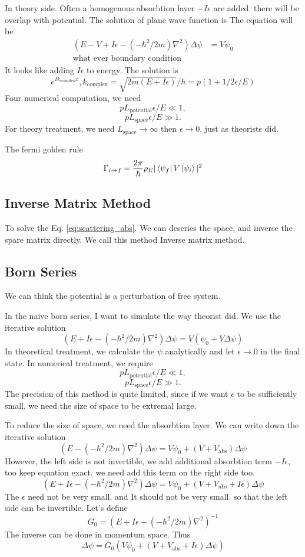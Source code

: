 \documentclass[12pt,twoside]{article}
\begin{document}
In theory side. Often a homogenous absorbtion layer $-I\epsilon$ are added. there will be overlap with potential. The solution of plane wave function is
The equation will be
\begin{align}
(E - V + I\epsilon -(-\hbar^2/2m)\nabla^2)\Delta\psi &= V\psi_0\\
\text{what ever boundary condition}
\end{align}
It looks like adding $I\epsilon$ to energy. The solution is
$$
e^{I k_\text{complex} x}, k_\text{complex} = \sqrt{2m(E+I\epsilon)}/\hbar =  p(1+1/2\epsilon/E)
$$
Four numerical computation, we need $$pL_\text{potential} \epsilon/E \ll 1,$$ $$ p L_\text{space}\epsilon/E \gg 1.$$
For theory treatment, we need $L_\text{space}\rightarrow \infty$ then $\epsilon \rightarrow 0$. just as theorists did.

The fermi golden rule
$$
\Gamma_{i\rightarrow f} = \frac{2\pi}{\hbar} \rho_E |\bra{\psi_f}V\ket{\psi_i}|^2
$$
\subsection{Inverse Matrix Method}
To solve the Eq. \ref{eq:scattering_abs}. We can descries the space, and inverse the spare matrix directly. We call this method Inverse matrix method.





\subsection{Born Series}
We can think the potential is a perturbation of free system.

In the naive born series, I want to simulate the way theorist did. We use the iterative solution
$$
(E + I\epsilon-(-\hbar^2/2m)\nabla^2)\Delta\psi = V(\psi_0 + V\Delta \psi)
$$
In theoretical treatment, we calculate the $\psi$ analytically and let $\epsilon \rightarrow 0$ in the final state.
In numerical treatment, we require
$$pL_\text{potential} \epsilon/E \ll 1,$$ $$ p L_\text{space}\epsilon/E \gg 1.$$
The precision of this method is quite limited, since if we want $\epsilon$ to be sufficiently small, we need the size of space to be extremal large.


To reduce the size of space, we need the absorbtion layer. We can write down the iterative solution
$$
(E -(-\hbar^2/2m)\nabla^2)\Delta\psi = V\psi_0 + (V+V_\text{abs})\Delta \psi
$$
However, the left side is not invertible, we add additional absorbtion term $-I\epsilon$, too keep equation exact. we need add this term on the right side too.
$$
(E + I\epsilon-(-\hbar^2/2m)\nabla^2)\Delta\psi = V\psi_0 + (V+V_\text{abs} + I\epsilon)\Delta \psi
$$
The $\epsilon$ need not be very small. and It should not be very small. so that the left side can be invertible.
Let's define
$$
G_0 = (E + I\epsilon-(-\hbar^2/2m)\nabla^2)^{-1}
$$
The inverse can be done in momentum space.
Thus
$$
\Delta\psi = G_0(V\psi_0 + (V+V_\text{abs} + I\epsilon)\Delta \psi)
$$
\end{document}

